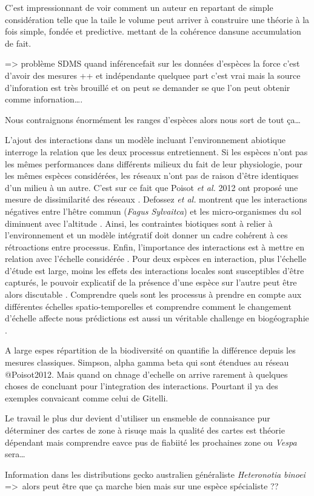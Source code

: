 C'est impressionnant de voir comment un auteur en repartant de simple
considération telle que la taile le volume peut arriver à construire une
théorie à la fois simple, fondée et predictive. mettant de la cohérence
dansune accumulation de fait.

=\textgreater{} problème SDMS quand inférencefait sur les données
d'espèces la force c'est d'avoir des mesures ++ et indépendante quelquee
part c'est vrai mais la source d'inforation est très brouillé et on peut
se demander se que l'on peut obtenir comme infornation\ldots{}.

Nous contraignons énormément les ranges d'espèces alors nous sort de
tout ça\ldots{}

L'ajout des interactions dans un modèle incluant l'environnement
abiotique interroge la relation que les deux processus entretiennent. Si
les espèces n'ont pas les mêmes performances dans différents milieux du
fait de leur physiologie, pour les mêmes espèces considérées, les
réseaux n'ont pas de raison d'être identiques d'un milieu à un autre.
C'est sur ce fait que Poisot \textit{et al.} 2012 ont proposé une mesure
de dissimilarité des réseaux \cite{Poisot2012}. Defossez \textit{et al.}
montrent que les interactions négatives entre l'hêtre commun
(\textit{Fagus Sylvaitca}) et les micro-organismes du sol diminuent avec
l'altitude \cite{Defossez2011}. Ainsi, les contraintes biotiques sont à
relier à l'environnement \cite{Brooker2006,Canham2006} et un modèle
intégratif doit donner un cadre cohérent à ces rétroactions entre
processus. Enfin, l'importance des interactions est à mettre en relation
avec l'échelle considérée \cite{Peterson2011}. Pour deux espèces en
interaction, plus l'échelle d'étude est large, moins les effets des
interactions locales sont susceptibles d'être capturés, le pouvoir
explicatif de la présence d'une espèce sur l'autre peut être alors
discutable \cite{Araujo2007}. Comprendre quels sont les processus à
prendre en compte aux différentes échelles spatio-temporelles et
comprendre comment le changement d'échelle affecte nous prédictions est
aussi un véritable challenge en biogéographie \cite{Martinez2012}.

A large espes répartition de la biodiversité on quantifie la différence
depuis les mesures classiques. Simpson, alpha gamma beta qui sont
étendues au réseau @Poisot2012. Mais quand on chnage d'echelle on arrive
rarement à quelques choses de concluant pour l'integration des
interactions. Pourtant il ya des exemples convaicant comme celui de
Gitelli.

Le travail le plus dur devient d'utiliser un ensmeble de connaisance pur
déterminer des cartes de zone à risuqe mais la qualité des cartes est
théorie dépendant mais comprendre eavce pus de fiabiité les prochaines
zone ou \emph{Vespa} sera\ldots{}

Information dans les distributions gecko australien généraliste
\emph{Heteronotia binoei} =\textgreater{}~alors peut être que ça marche
bien mais sur une espèce spécialiste ??
